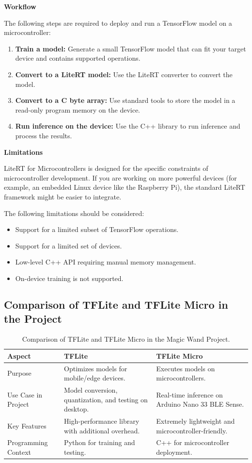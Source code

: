 \textbf{Workflow}

The following steps are required to deploy and run a TensorFlow model on a microcontroller:

\begin{enumerate}
	\item \textbf{Train a model:} Generate a small TensorFlow model that can fit your target device and contains supported operations.
	\item \textbf{Convert to a LiteRT model:} Use the LiteRT converter to convert the model.
	\item \textbf{Convert to a C byte array:} Use standard tools to store the model in a read-only program memory on the device.
	\item \textbf{Run inference on the device:} Use the C++ library to run inference and process the results.\cite{litert:2023}
\end{enumerate}

\textbf{Limitations}

LiteRT for Microcontrollers is designed for the specific constraints of microcontroller development. If you are working on more powerful devices (for example, an embedded Linux device like the Raspberry Pi), the standard LiteRT framework might be easier to integrate.\cite{litert:2023}

The following limitations should be considered:

\begin{itemize}
	\item Support for a limited subset of TensorFlow operations.
	\item Support for a limited set of devices.
	\item Low-level C++ API requiring manual memory management.
	\item On-device training is not supported.
\end{itemize}


\subsection{Comparison of TFLite and TFLite Micro in the Project}
\begin{table}[h!]
	\centering
	\begin{tabular}{|p{4cm}|p{5cm}|p{5cm}|}
		\hline
		\textbf{Aspect} & \textbf{TFLite} & \textbf{TFLite Micro} \\
		\hline
		Purpose & Optimizes models for mobile/edge devices. & Executes models on microcontrollers. \\
		\hline
		Use Case in Project & Model conversion, quantization, and testing on desktop. & Real-time inference on Arduino Nano 33 BLE Sense. \\
		\hline
		Key Features & High-performance library with additional overhead. & Extremely lightweight and microcontroller-friendly. \\
		\hline
		Programming Context & Python for training and testing. & C++ for microcontroller deployment. \\
		\hline
	\end{tabular}
	\caption{Comparison of TFLite and TFLite Micro in the Magic Wand Project.}
\end{table}


